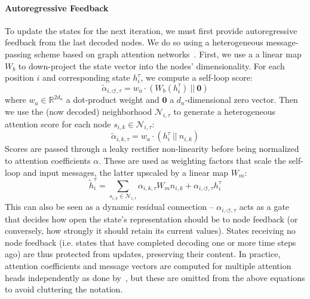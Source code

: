 \paragraph{Autoregressive Feedback}
To update the states for the next iteration, we must first provide autoregressive feedback from the last decoded nodes.
We do so using a heterogeneous message-passing scheme based on graph attention networks~\cite{velivckovic2018graph,brody2021attentive}.
First, we use a a linear map $W_b$ to down-project the state vector into the nodes' dimensionality.
For each position $i$ and corresponding state $h^\tau_i$, we compute a self-loop score:
\begin{equation}
\tilde{\alpha}_{i,\circlearrowleft,\tau} = w_{a} \cdot (W_b(h^\tau_i) \ ||  \ \mathbf{0})
\end{equation}
where $w_a \in \mathbb{R}^{2d_n}$ a dot-product weight and $\mathbf{0}$ a $d_n$-dimensional zero vector.
Then we use the (now decoded) neighborhood $\mathcal{N}_{i, \tau}$ to generate a heterogeneous attention score for each node $s_{i, k} \in \mathcal{N}_{i, \tau}$:
\begin{equation}
\tilde{\alpha}_{i,k,\tau} = w_a \cdot (h^{\tau}_i \ || \ n_{i, k})
\end{equation}
Scores are passed through a leaky rectifier non-linearity before being normalized to attention coefficients $\alpha$.
These are used as weighting factors that scale the self-loop and input messages, the latter upscaled by a linear map $W_m$:
\begin{equation}
	\tilde{h}^\tau_i = \sum_{s_{i, k} \in \mathcal{N}_{i,\tau}} {\alpha}_{i,k,\tau}W_m n_{i,k} + {\alpha}_{i,\circlearrowleft,\tau} h^\tau_i
\end{equation}
This can also be seen as a dynamic residual connection -- $\alpha_{i,\circlearrowleft,\tau}$ acts as a gate that decides how open the state's representation should be to node feedback (or conversely, how strongly it should retain its current values).
States receiving no node feedback (i.e. states that have completed decoding one or more time steps ago) are thus protected from updates, preserving their content.
In practice, attention coefficients and message vectors are computed for multiple attention heads independently as done by~\citet{vaswani2017attention}, but these are omitted from the above equations to avoid cluttering the notation.

